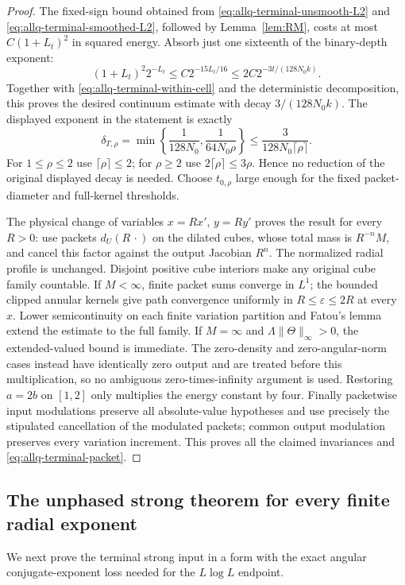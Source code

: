 \documentclass[11pt]{article}
\numberwithin{equation}{section}
\theoremstyle{remark}
\theoremstyle{definition}
\begin{document}
\begin{proof}
The fixed-sign bound obtained from
\eqref{eq:allq-terminal-unsmooth-L2} and
\eqref{eq:allq-terminal-smoothed-L2}, followed by
Lemma~\ref{lem:RM}, costs at most $C(1+L_t)^2$ in squared energy.
Absorb just one sixteenth of the binary-depth exponent:
\[
 (1+L_t)^2 2^{-L_t}
 \le C2^{-15L_t/16}
 \le 2C2^{-3t/(128N_0k)}.
\]
Together with \eqref{eq:allq-terminal-within-cell} and the deterministic
decomposition, this proves the desired continuum estimate with decay
$3/(128N_0k)$.  The displayed exponent in the statement is exactly
\[
 \delta_{T,\rho}
 =\min\left\{\frac1{128N_0},\frac1{64N_0\rho}\right\}
 \le\frac3{128N_0\lceil\rho\rceil}.
\]
For $1\le\rho\le2$ use $\lceil\rho\rceil\le2$; for $\rho\ge2$
use $2\lceil\rho\rceil\le3\rho$.  Hence no reduction of the
original displayed decay is needed.  Choose $t_{0,\rho}$ large enough
for the fixed packet-diameter and full-kernel thresholds.

The physical change of variables $x=Rx'$, $y=Ry'$ proves the result
for every $R>0$: use packets $d_U(R\,\cdot)$ on the dilated cubes,
whose total mass is $R^{-n}M$, and cancel this factor against the
output Jacobian $R^n$.  The normalized radial profile is unchanged.
Disjoint positive cube interiors make any original cube family
countable.  If $M<\infty$, finite packet sums converge in $L^1$; the
bounded clipped annular kernels give path convergence uniformly in
$R\le\varepsilon\le2R$ at every $x$.  Lower semicontinuity on each
finite variation partition and Fatou's lemma extend the estimate to
the full family.  If $M=\infty$ and
$\Lambda\|\Theta\|_\infty>0$, the extended-valued bound is immediate.
The zero-density and zero-angular-norm cases instead have identically
zero output and are treated before this multiplication, so no ambiguous
zero-times-infinity argument is used.  Restoring $a=2b$ on $[1,2]$
only multiplies the energy constant by four.  Finally packetwise input
modulations preserve all absolute-value hypotheses and use precisely
the stipulated cancellation of the modulated packets; common output
modulation preserves every variation increment.  This proves all the
claimed invariances and \eqref{eq:allq-terminal-packet}.
\end{proof}

\subsection{The unphased strong theorem for every finite radial exponent}

We next prove the terminal strong input in a form with the exact angular
conjugate-exponent loss needed for the $L\log L$ endpoint.
\end{document}
